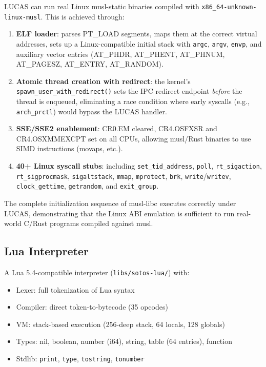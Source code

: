 \documentclass[11pt,letterpaper]{article}
\theoremstyle{definition}
\begin{document}
LUCAS can run real Linux musl-static binaries compiled with
\texttt{x86\_64-unknown-linux-musl}. This is achieved through:

\begin{enumerate}[nosep]
    \item \textbf{ELF loader}: parses PT\_LOAD segments, maps them at the correct
          virtual addresses, sets up a Linux-compatible initial stack with
          \texttt{argc}, \texttt{argv}, \texttt{envp}, and auxiliary vector entries
          (AT\_PHDR, AT\_PHENT, AT\_PHNUM, AT\_PAGESZ, AT\_ENTRY, AT\_RANDOM).
    \item \textbf{Atomic thread creation with redirect}: the kernel's
          \texttt{spawn\_user\_with\_redirect()} sets the IPC redirect endpoint
          \emph{before} the thread is enqueued, eliminating a race condition where
          early syscalls (e.g., \texttt{arch\_prctl}) would bypass the LUCAS handler.
    \item \textbf{SSE/SSE2 enablement}: CR0.EM cleared, CR4.OSFXSR and
          CR4.OSXMMEXCPT set on all CPUs, allowing musl/Rust binaries to use
          SIMD instructions (movaps, etc.).
    \item \textbf{40+ Linux syscall stubs}: including \texttt{set\_tid\_address},
          \texttt{poll}, \texttt{rt\_sigaction}, \texttt{rt\_sigprocmask},
          \texttt{sigaltstack}, \texttt{mmap}, \texttt{mprotect}, \texttt{brk},
          \texttt{write}/\texttt{writev}, \texttt{clock\_gettime},
          \texttt{getrandom}, and \texttt{exit\_group}.
\end{enumerate}

The complete initialization sequence of musl-libc executes correctly under
LUCAS, demonstrating that the Linux ABI emulation is sufficient to run
real-world C/Rust programs compiled against musl.

\subsection{Lua Interpreter}

A Lua 5.4-compatible interpreter (\texttt{libs/sotos-lua/}) with:
\begin{itemize}[nosep]
    \item Lexer: full tokenization of Lua syntax
    \item Compiler: direct token-to-bytecode (35 opcodes)
    \item VM: stack-based execution (256-deep stack, 64 locals, 128 globals)
    \item Types: nil, boolean, number (i64), string, table (64 entries), function
    \item Stdlib: \texttt{print}, \texttt{type}, \texttt{tostring}, \texttt{tonumber}
\end{itemize}
\end{document}
